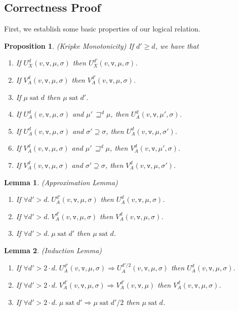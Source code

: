 \documentclass[nocopyrightspace,preprint]{sigplanconf}
\newcommand{\betterstate}[3]{{#2}\, {\sqsupseteq}^{#1} {#3}}
\renewcommand{\implies}{\Rightarrow}
\newcommand{\term}[1]{\ensuremath{\mathtt{{#1}}}}
\newcommand{\satisfy}[2]{{#1}\;\mathrm{sat}\;{#2}}
\newtheorem{prop}{Proposition}
\newtheorem{lemma}{Lemma}
\begin{document}
\subsection{Correctness Proof}

First, we establish some basic properties of our logical relation. 

\begin{prop}{(Kripke Monotonicity)}
If $d' \geq d$, we have that
\begin{enumerate}
\item If $U^d_X(v, \term{v}, \mu, \sigma)$ then $U^{d'}_X(v, \term{v}, \mu, \sigma)$. 
\item If $V^d_A(v, \term{v}, \mu, \sigma)$ then $V^{d'}_A(v, \term{v}, \mu, \sigma)$. 
\item If $\satisfy{\mu}{d}$ then $\satisfy{\mu}{d'}$. 
\item If $U^d_A(v, \term{v}, \mu, \sigma)$ and $\betterstate{d}{\mu'}{\mu}$, then $U^d_A(v, \term{v}, \mu',\sigma)$.
\item If $U^d_A(v, \term{v}, \mu, \sigma)$ and $\sigma' \supseteq \sigma$, then $U^d_A(v, \term{v}, \mu,\sigma')$.
\item If $V^d_A(v, \term{v}, \mu, \sigma)$ and $\betterstate{d}{\mu'}{\mu}$, then $V^d_A(v, \term{v}, \mu',\sigma)$.
\item If $V^d_A(v, \term{v}, \mu, \sigma)$ and $\sigma' \supseteq \sigma$, then $V^d_A(v, \term{v}, \mu,\sigma')$.
\end{enumerate}
\end{prop}

\begin{lemma}{(Approximation Lemma)}
\begin{enumerate}
  \item If $\forall d' > d.\; U^{d'}_A(v, \term{v}, \mu, \sigma)$ then $U^d_A(v, \term{v}, \mu, \sigma)$. 
  \item If $\forall d' > d.\; V^{d'}_A(v, \term{v}, \mu, \sigma)$ then $V^d_A(v, \term{v}, \mu, \sigma)$. 
  \item If $\forall d' > d.\; \satisfy{\mu}{d'}$ then $\satisfy{\mu}{d}$. 
\end{enumerate}
\end{lemma}

\begin{lemma}{(Induction Lemma)}
\begin{enumerate}
  \item If $\forall d' > 2\cdot d.\; U^{d'}_A(v, \term{v}, \mu, \sigma) \implies U^{d'/2}_A(v, \term{v}, \mu, \sigma)$ then $U^d_A(v, \term{v}, \mu, \sigma)$. 
  \item If $\forall d' > 2\cdot d.\; V^{d'}_A(v, \term{v}, \mu, \sigma) \implies V^{d'}_A(v, \term{v}, \mu)$ then $V^d_A(v, \term{v}, \mu, \sigma)$. 
  \item If $\forall d' > 2\cdot d.\; \satisfy{\mu}{d'} \implies \satisfy{\mu}{d'/2}$ then $\satisfy{\mu}{d}$. 
\end{enumerate}
\end{lemma}
\end{document}
